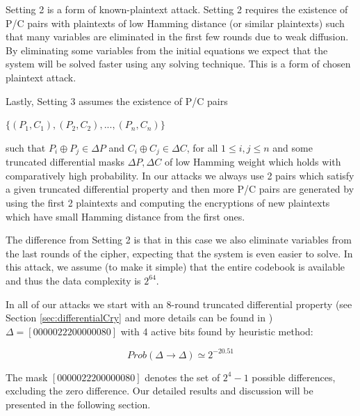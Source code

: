 Setting 2 is a form of known-plaintext attack. Setting 2 requires the existence of P/C pairs with plaintexts
of low Hamming distance (or similar plaintexts)
such that many variables are eliminated in the first few rounds due to weak
diffusion. By eliminating some variables from the initial equations we expect that
the system will be solved faster using any solving technique. This is a form of
chosen plaintext attack.

Lastly, Setting 3 assumes the existence of P/C pairs

\begin{center}
	$\{(P_1,C_1),(P_2,C_2),...,(P_n,C_n)\}$
\end{center}

such that
$P_i\oplus P_j \in \Delta P$ and $C_i\oplus C_j \in \Delta C$, for
all $1\leq i,j \leq n$ and some truncated differential masks $\Delta P,\Delta C$
of low Hamming weight which holds with comparatively high probability.
In our attacks we always use 2 pairs which satisfy a given truncated
differential property and then more P/C pairs are generated by using the
first 2 plaintexts and computing the encryptions of new plaintexts which have small Hamming distance from the
first ones. 

The difference
from Setting 2 is that in this case we also eliminate variables
from the last rounds of the cipher, expecting that the system is even easier to solve. In this
attack, we assume (to make it simple) that the entire codebook is available and thus the
data complexity is $2^{64}$.

In all of our attacks we start with an 8-round truncated differential property (see Section \ref{sec:differentialCry} and more details can be found in \cite{TheoPhD}) $\Delta=[00000222 00000080]$
with 4 active bits found by heuristic method:

\begin{equation}
Prob(\Delta\rightarrow \Delta)\simeq2^{-20.51}
\end{equation}

The mask $[00000222 00000080]$ denotes the set of $2^4-1$ possible differences,
excluding the zero difference.
Our detailed results and discussion will be presented in the following section.

